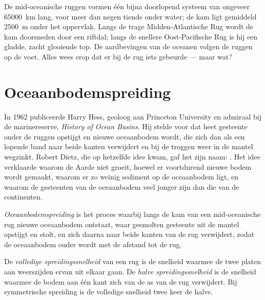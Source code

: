 De mid-oceanische ruggen vormen één bijna doorlopend systeem van ongeveer
\qty{65000}{km} lang, voor meer dan negen tiende onder water; de kam ligt
gemiddeld \qty{2500}{m} onder het oppervlak. Langs de trage Midden-Atlantische Rug
wordt de kam doorsneden door een riftdal; langs de snellere Oost-Pacifische Rug is
hij een gladde, zacht glooiende top. De aardbevingen van de oceanen volgen de
ruggen op de voet. Alles wees erop dat er bij de rug iets
gebeurde --- maar wat?

\section{Oceaanbodemspreiding}

\begin{history}
In 1962 publiceerde Harry Hess, geoloog aan Princeton University en admiraal bij
de marinereserve, \emph{History of Ocean Basins}.
Hij stelde voor dat heet gesteente onder de ruggen opstijgt en nieuwe oceaanbodem
wordt, die zich dan als een lopende band naar beide kanten verwijdert en bij de
troggen weer in de mantel wegzinkt. Robert Dietz, die op hetzelfde idee kwam, gaf
het zijn naam: . Het idee verklaarde waarom de Aarde niet
groeit, hoewel er voortdurend nieuwe bodem wordt gemaakt, waarom er zo weinig
sediment op de oceaanbodem ligt, en waarom de gesteenten van de oceaanbodem veel
jonger zijn dan die van de continenten.
\end{history}

\begin{definition}[Oceaanbodemspreiding]\label{def:g11:drift-to-spreading:spreading}
\emph{Oceaanbodemspreiding} is het proces waarbij
langs de kam van een mid-oceanische rug nieuwe oceaanbodem ontstaat, waar
gesmolten gesteente uit de mantel opstijgt en stolt, en zich daarna naar beide
kanten van de rug verwijdert, zodat de oceaanbodem ouder wordt met de afstand tot
de rug.
\end{definition}

\begin{definition}[Spreidingssnelheid]\label{def:g11:drift-to-spreading:spreading-rate}
De \emph{volledige spreidingssnelheid} van een rug is
de snelheid waarmee de twee platen aan weerszijden ervan uit elkaar gaan. De
\emph{halve spreidingssnelheid} is de snelheid waarmee de bodem aan één kant zich
van de as van de rug verwijdert. Bij symmetrische spreiding is de volledige
snelheid twee keer de halve.
\end{definition}


